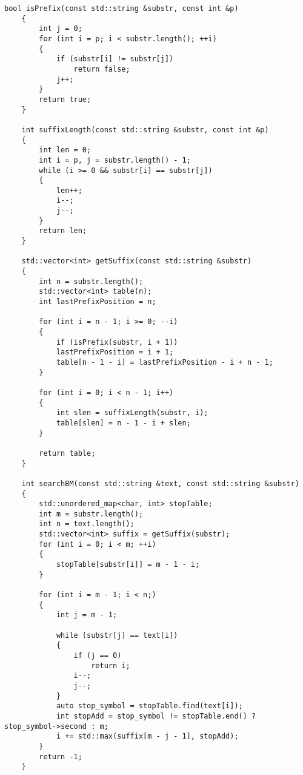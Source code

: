 \documentclass[a4paper,12pt]{report}
\begin{document}
	        \begin{lstlisting}[frame = single, breaklines, label = list:bm, caption = Алгоритм Бойера-Мура]
	bool isPrefix(const std::string &substr, const int &p)
	{
	    int j = 0;
	    for (int i = p; i < substr.length(); ++i)
	    {
	        if (substr[i] != substr[j])
	            return false;
	        j++;
	    }
	    return true;
	}
	
	int suffixLength(const std::string &substr, const int &p)
	{
	    int len = 0;
	    int i = p, j = substr.length() - 1;
	    while (i >= 0 && substr[i] == substr[j])
	    {
	        len++;
	        i--;
	        j--;
	    }
	    return len;
	}
	
	std::vector<int> getSuffix(const std::string &substr)
	{
	    int n = substr.length();
	    std::vector<int> table(n);
	    int lastPrefixPosition = n;
	
	    for (int i = n - 1; i >= 0; --i)
	    {
	        if (isPrefix(substr, i + 1))
	        lastPrefixPosition = i + 1;
	        table[n - 1 - i] = lastPrefixPosition - i + n - 1;
	    }
	
	    for (int i = 0; i < n - 1; i++)
	    {
	        int slen = suffixLength(substr, i);
	        table[slen] = n - 1 - i + slen;
	    }
	
	    return table;
	}
	
	int searchBM(const std::string &text, const std::string &substr)
	{
	    std::unordered_map<char, int> stopTable;
	    int m = substr.length();
	    int n = text.length();
	    std::vector<int> suffix = getSuffix(substr);
	    for (int i = 0; i < m; ++i)
	    {
	        stopTable[substr[i]] = m - 1 - i;
	    }
	
	    for (int i = m - 1; i < n;)
	    {
	        int j = m - 1;
	
	        while (substr[j] == text[i])
	        {
	            if (j == 0)
	                return i;
	            i--;
	            j--;
	        }
	        auto stop_symbol = stopTable.find(text[i]);
	        int stopAdd = stop_symbol != stopTable.end() ? stop_symbol->second : m;
	        i += std::max(suffix[m - j - 1], stopAdd);
	    }
	    return -1;
	}
	        \end{lstlisting}
	
\end{document}
